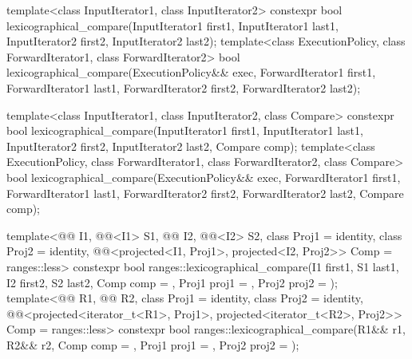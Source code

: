 %
\begin{itemdecl}
template<class InputIterator1, class InputIterator2>
  constexpr bool
    lexicographical_compare(InputIterator1 first1, InputIterator1 last1,
                            InputIterator2 first2, InputIterator2 last2);
template<class ExecutionPolicy, class ForwardIterator1, class ForwardIterator2>
  bool
    lexicographical_compare(ExecutionPolicy&& exec,
                            ForwardIterator1 first1, ForwardIterator1 last1,
                            ForwardIterator2 first2, ForwardIterator2 last2);

template<class InputIterator1, class InputIterator2, class Compare>
  constexpr bool
    lexicographical_compare(InputIterator1 first1, InputIterator1 last1,
                            InputIterator2 first2, InputIterator2 last2,
                            Compare comp);
template<class ExecutionPolicy, class ForwardIterator1, class ForwardIterator2,
         class Compare>
  bool
    lexicographical_compare(ExecutionPolicy&& exec,
                            ForwardIterator1 first1, ForwardIterator1 last1,
                            ForwardIterator2 first2, ForwardIterator2 last2,
                            Compare comp);

template<@@ I1, @@<I1> S1, @@ I2, @@<I2> S2,
         class Proj1 = identity, class Proj2 = identity,
         @@<projected<I1, Proj1>,
                                    projected<I2, Proj2>> Comp = ranges::less>
  constexpr bool
    ranges::lexicographical_compare(I1 first1, S1 last1, I2 first2, S2 last2,
                                    Comp comp = {}, Proj1 proj1 = {}, Proj2 proj2 = {});
template<@@ R1, @@ R2, class Proj1 = identity,
         class Proj2 = identity,
         @@<projected<iterator_t<R1>, Proj1>,
                                    projected<iterator_t<R2>, Proj2>> Comp = ranges::less>
  constexpr bool
    ranges::lexicographical_compare(R1&& r1, R2&& r2, Comp comp = {},
                                    Proj1 proj1 = {}, Proj2 proj2 = {});
\end{itemdecl}

